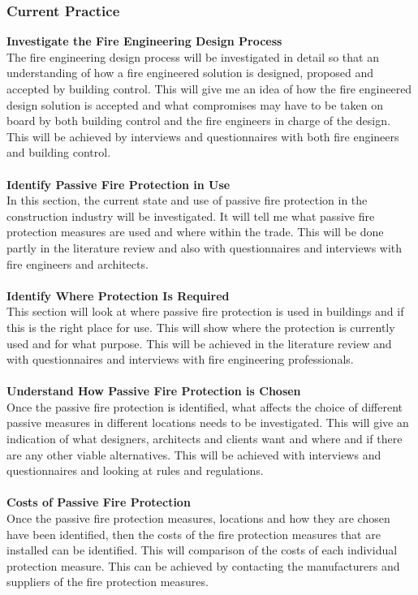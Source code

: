\documentclass[table,a4paper,oneside]{book}
\begin{document}
\subsubsection{Current Practice}
\textbf{Investigate the Fire Engineering Design Process}
\\
The fire engineering design process will be investigated in detail so that an understanding of how a fire engineered solution is designed, proposed and accepted by building control. This will give me an idea of how the fire engineered design solution is accepted and what compromises may have to be taken on board by both building control and the fire engineers in charge of the design. This will be achieved by interviews and questionnaires with both fire engineers and building control.
\\
\\
\textbf{Identify Passive Fire Protection in Use}
\\
In this section, the current state and use of passive fire protection in the construction industry will be investigated. It will tell me what passive fire protection measures are used and where within the trade. This will be done partly in the literature review and also with questionnaires and interviews with fire engineers and architects.
\\
\\
\textbf{Identify Where Protection Is Required}
\\
This section will look at where passive fire protection is used in buildings and if this is the right place for use.  This will show where the protection is currently used and for what purpose. This will be achieved in the literature review and with questionnaires and interviews with fire engineering professionals.
\\
\\
\textbf{Understand How Passive Fire Protection is Chosen}
\\
Once the passive fire protection is identified, what affects the choice of different passive measures in different locations needs to be investigated. This will give an indication of what designers, architects and clients want and where and if there are any other viable alternatives. This will be achieved with interviews and questionnaires and looking at rules and regulations.
\\
\\
\textbf{Costs of Passive Fire Protection}
\\
Once the passive fire protection measures, locations and how they are chosen have been identified, then the costs of the fire protection measures that are installed can be identified. This will comparison of the costs of each individual protection measure. This can be achieved by contacting the manufacturers and suppliers of the fire protection measures.
\end{document}
